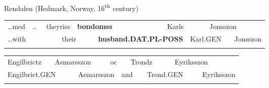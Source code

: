 \begin{listWWNumileveli}
\item {}

\begin{styleExample}
Rendalen (Hedmark, Norway, 16\textsuperscript{th} century)

\end{styleExample}

\end{listWWNumileveli}

\begin{tabular}{llllllllllll}
\lsptoprule
…med & \multicolumn{2}{l}{…

} & \multicolumn{2}{l}{theyriss

} & \multicolumn{2}{l}{{\bfseries bondomss}

} & \multicolumn{2}{l}{Karls

} & \multicolumn{2}{l}{Jonsszon

} & \\
\multicolumn{2}{l}{…with

} & \multicolumn{2}{l}{} & \multicolumn{2}{l}{their

} & \multicolumn{2}{l}{{\bfseries husband.DAT.PL-POSS}

} & \multicolumn{2}{l}{Karl.GEN

} & \multicolumn{2}{l}{Jonsszon

}\\
\lspbottomrule
\end{tabular}

\begin{tabular}{llllllllll}
\lsptoprule
Engilbrictz & \multicolumn{2}{l}{Asmarsszon

} & \multicolumn{2}{l}{oc

} & \multicolumn{2}{l}{Trondz

} & \multicolumn{2}{l}{Eyriksszon

} & \\
\multicolumn{2}{l}{Engilbrict.GEN

} & \multicolumn{2}{l}{Asmarsszon

} & \multicolumn{2}{l}{and

} & \multicolumn{2}{l}{Trond.GEN

} & \multicolumn{2}{l}{ Eyriksszon

}\\
\lspbottomrule
\end{tabular}

